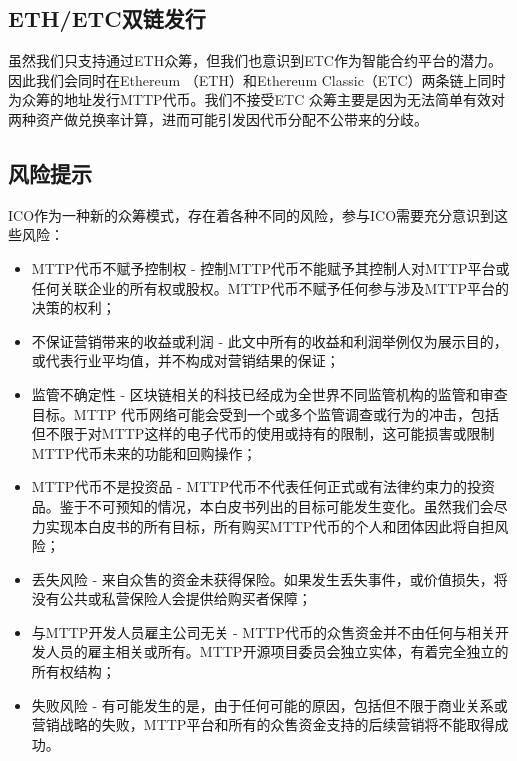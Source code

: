 \documentclass[UTF8,nofonts]{ctexart}
\begin{document}
\begin{appendices}
\subsection{ETH/ETC双链发行\label{sec:chains}}

虽然我们只支持通过ETH众筹，但我们也意识到ETC作为智能合约平台的潜力。因此我们会同时在Ethereum （ETH）和Ethereum Classic（ETC）两条链上同时为众筹的地址发行MTTP代币。我们不接受ETC 众筹主要是因为无法简单有效对两种资产做兑换率计算，进而可能引发因代币分配不公带来的分歧。


\subsection{风险提示\label{sec:risks}}

ICO作为一种新的众筹模式，存在着各种不同的风险，参与ICO需要充分意识到这些风险：
\begin{itemize}
	\item MTTP代币不赋予控制权 - 控制MTTP代币不能赋予其控制人对MTTP平台或任何关联企业的所有权或股权。MTTP代币不赋予任何参与涉及MTTP平台的决策的权利；
	\item 不保证营销带来的收益或利润 - 此文中所有的收益和利润举例仅为展示目的，或代表行业平均值，并不构成对营销结果的保证；
	\item 监管不确定性 - 区块链相关的科技已经成为全世界不同监管机构的监管和审查目标。MTTP 代币网络可能会受到一个或多个监管调查或行为的冲击，包括但不限于对MTTP这样的电子代币的使用或持有的限制，这可能损害或限制MTTP代币未来的功能和回购操作；
	\item MTTP代币不是投资品 - MTTP代币不代表任何正式或有法律约束力的投资品。鉴于不可预知的情况，本白皮书列出的目标可能发生变化。虽然我们会尽力实现本白皮书的所有目标，所有购买MTTP代币的个人和团体因此将自担风险；
	\item 丢失风险 - 来自众售的资金未获得保险。如果发生丢失事件，或价值损失，将没有公共或私营保险人会提供给购买者保障；
	\item 与MTTP开发人员雇主公司无关 - MTTP代币的众售资金并不由任何与相关开发人员的雇主相关或所有。MTTP开源项目委员会独立实体，有着完全独立的所有权结构；
	\item 失败风险 - 有可能发生的是，由于任何可能的原因，包括但不限于商业关系或营销战略的失败，MTTP平台和所有的众售资金支持的后续营销将不能取得成功。
\end{itemize}


\end{appendices}
\end{document}
